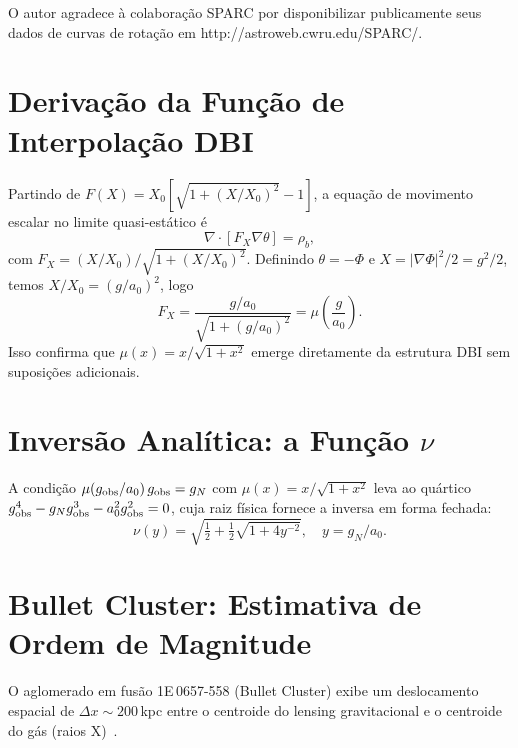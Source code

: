 \documentclass[aps,prd,twocolumn,showpacs,superscriptaddress]{revtex4-2}
\newcommand{\aO}{a_0}
\newcommand{\Xzero}{X_0}
\begin{document}
\begin{acknowledgments}
O autor agradece à colaboração SPARC por disponibilizar
publicamente seus dados de curvas de rotação em
http://astroweb.cwru.edu/SPARC/.
\end{acknowledgments}

\appendix

\section{Derivação da Função de Interpolação DBI}
\label{app:DBI}

Partindo de $F(X) = \Xzero[\sqrt{1+(X/\Xzero)^2}-1]$,
a equação de movimento escalar no limite quasi-estático é
\begin{equation}
  \nabla\cdot[F_X\nabla\theta] = \rho_b,
\end{equation}
com $F_X = (X/\Xzero)/\sqrt{1+(X/\Xzero)^2}$.
Definindo $\theta = -\Phi$ e $X = |\nabla\Phi|^2/2 = g^2/2$,
temos $X/\Xzero = (g/\aO)^2$, logo
\begin{equation}
  F_X = \frac{g/\aO}{\sqrt{1+(g/\aO)^2}} = \mu\!\left(\frac{g}{\aO}\right).
\end{equation}
Isso confirma que $\mu(x) = x/\sqrt{1+x^2}$ emerge diretamente
da estrutura DBI sem suposições adicionais.

\section{Inversão Analítica: a Função $\nu$}
\label{app:nu}

A condição $\mu(g_{\rm obs}/\aO)\,g_{\rm obs} = g_N$
com $\mu(x) = x/\sqrt{1+x^2}$ leva ao quártico
$g_{\rm obs}^4 - g_N g_{\rm obs}^3 - \aO^2 g_{\rm obs}^2 = 0$,
cuja raiz física fornece a inversa em forma fechada:
\begin{equation}
  \nu(y) = \sqrt{\tfrac{1}{2} + \tfrac{1}{2}\sqrt{1+4y^{-2}}},
  \quad y = g_N/\aO.
\end{equation}

\section{Bullet Cluster: Estimativa de Ordem de Magnitude}
\label{app:bullet}

O aglomerado em fusão 1E\,0657-558 (Bullet Cluster) exibe um
deslocamento espacial de $\Delta x \sim 200$\,kpc entre o
centroide do lensing gravitacional e o centroide do gás
(raios X)~\cite{Clowe2006}.
\end{document}
